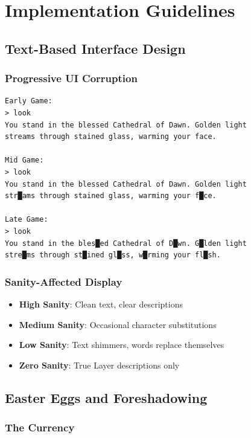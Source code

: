 \documentclass[11pt,a4paper,twoside]{book}
\begin{document}
\chapter{Implementation Guidelines}

\section{Text-Based Interface Design}

\subsection{Progressive UI Corruption}

\begin{verbatim}
Early Game:
> look
You stand in the blessed Cathedral of Dawn. Golden light 
streams through stained glass, warming your face.

Mid Game:
> look
You stand in the blessed Cathedral of Dawn. Golden light 
str█ams through stained glass, warming your f█ce.

Late Game:
> look
You stand in the bles█ed Cathedral of D█wn. G█lden light 
stre█ms through st█ined gl█ss, w█rming your fl█sh.
\end{verbatim}

\subsection{Sanity-Affected Display}

\begin{itemize}
    \item \textbf{High Sanity}: Clean text, clear descriptions
    \item \textbf{Medium Sanity}: Occasional character substitutions
    \item \textbf{Low Sanity}: Text shimmers, words replace themselves
    \item \textbf{Zero Sanity}: True Layer descriptions only
\end{itemize}

\section{Easter Eggs and Foreshadowing}

\subsection{The Currency}
\end{document}
